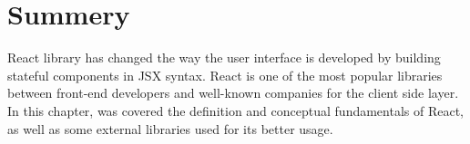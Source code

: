 \section{Summery}

React library has changed the way the user interface is developed by building stateful components in JSX syntax. React is one of the most popular libraries between front-end developers and well-known companies for the client side layer. In this chapter, was covered the definition and conceptual fundamentals of React, as well as some external libraries used for its better usage. \par
